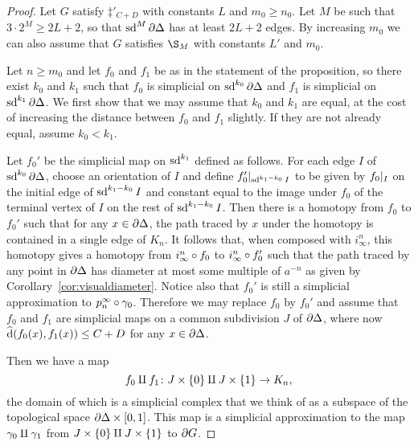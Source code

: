 \documentclass[a4paper]{article}
\begin{document}
\begin{proof}
  Let $G$ satisfy $\ddag'_{C+D}$ with constants $L$ and $m_0 \geq n_0$.
  Let $M$ be such that $3\cdot2^M \geq 2L+2$, so that $\operatorname{sd}^M\partial\Delta$
  has at least $2L+2$ edges.  By increasing $m_0$ we can also assume that $G$
  satisfies $\S_M$ with constants $L'$ and $m_0$.

  Let $n \geq m_0$ and let $f_0$ and $f_1$ be as in the statement of the
  proposition, so there exist $k_0$ and $k_1$ such that $f_0$ is simplicial on
  $\operatorname{sd}^{k_0}\partial\Delta$ and $f_1$ is simplicial on
  $\operatorname{sd}^{k_1}\partial\Delta$. We first show that we may assume that $k_0$ and
  $k_1$ are equal, at the cost of increasing the distance between $f_0$ and
  $f_1$ slightly. If they are not already equal, assume $k_0 < k_1$.

  Let $f_0'$ be the simplicial map on $\operatorname{sd}^{k_1}$ defined as follows. For each
  edge $I$ of $\operatorname{sd}^{k_0}\partial\Delta$, choose an orientation of $I$ and
  define $f_0'\vert_{\operatorname{sd}^{k_1-k_0}I}$ to be given by $f_0\vert_{I}$
  on the initial edge of $\operatorname{sd}^{k_1-k_0}I$ and constant equal to the image under
  $f_0$ of the terminal vertex of $I$ on the rest of $\operatorname{sd}^{k_1-k_0}I$. Then
  there is a homotopy from $f_0$ to $f_0'$ such that for any $x \in
  \partial\Delta$, the path traced by $x$ under the homotopy is contained in a
  single edge of $K_n$.  It follows that, when composed with $i^n_\infty$, this
  homotopy gives a homotopy from $i^n_\infty\circ f_0$ to $i^n_\infty
  \circ f_0'$ such that the path traced by any point in $\partial\Delta$
  has diameter at most some multiple of $a^{-n}$ as given by
  Corollary~\ref{cor:visualdiameter}.  Notice also that $f_0'$ is still a
  simplicial approximation to $p^\infty_n\circ\gamma_0$.  Therefore we may
  replace $f_0$ by $f_0'$ and assume that $f_0$ and $f_1$ are simplicial maps
  on a common subdivision $J$ of $\partial\Delta$, where now $\operatorname{\widehat{d}}(f_0(x),
  f_1(x))\leq C+D$ for any $x \in \partial\Delta$.
  
  Then we have a map 
  \begin{equation*}
    f_0 \amalg f_1 \colon J \times \{0\} \amalg J \times \{1\}
          \to K_n,
  \end{equation*}
  the domain of which is a simplicial complex that we think of as a subspace of
  the topological space $\partial\Delta\times[0,1]$. This map is a
  simplicial approximation to the map $\gamma_0 \amalg \gamma_1$ from
  $J\times\{0\} \amalg J \times\{1\}$ to $\partial G$. 
  

\end{proof}
\end{document}
